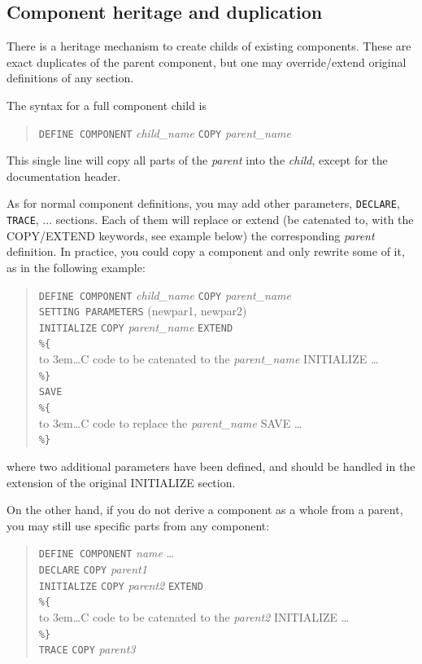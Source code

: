 \subsection{Component heritage and duplication}

There is a heritage mechanism to create childs of existing components. These are exact duplicates of the parent component, but one may override/extend original definitions of any section.

The syntax for a full component child is
\begin{quote}
  \texttt{DEFINE COMPONENT} {\it child\_name} \texttt{COPY} {\it parent\_name}
\end{quote}
This single line will copy all parts of the {\it parent} into the {\it child}, except for the documentation header.

As for normal component definitions, you may add other parameters, \texttt{DECLARE}, \texttt{TRACE}, ... sections. Each of them will replace or extend (be catenated to, with the COPY/EXTEND keywords, see example below) the corresponding {\it parent} definition. In practice, you could copy a component and only rewrite some of it, as in the following example:
\begin{quote}
  \texttt{DEFINE COMPONENT} {\it child\_name} \texttt{COPY} {\it parent\_name} \\

  \texttt{SETTING PARAMETERS} (newpar1, newpar2) \\
  \texttt{INITIALIZE} \texttt{COPY} {\it parent\_name} \texttt{EXTEND} \\
  \verb|%{|  \\
  \hbox to 3em{}\ldots C code to be catenated to the {\it parent\_name} INITIALIZE \ldots  \\
  \verb|%}| \\
  \texttt{SAVE} \\
  \verb|%{|  \\
  \hbox to 3em{}\ldots C code to replace the {\it parent\_name} SAVE \ldots  \\
  \verb|%}| \\
\end{quote}
where two additional parameters have been defined, and should be handled in the extension of the original INITIALIZE section.

On the other hand, if you do not derive a component as a whole from a parent, you may still use specific parts from any component:
\begin{quote}
  \texttt{DEFINE COMPONENT} {\it name} \ldots \\
  \texttt{DECLARE} \texttt{COPY} {\it parent1} \\
  \texttt{INITIALIZE} \texttt{COPY} {\it parent2} \texttt{EXTEND} \\
  \verb|%{|  \\
  \hbox to 3em{}\ldots C code to be catenated to the {\it parent2} INITIALIZE \ldots  \\
  \verb|%}| \\
  \texttt{TRACE} \texttt{COPY} {\it parent3}
\end{quote}

